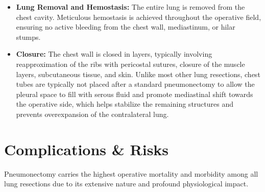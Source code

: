 \begin{itemize}
  \item \textbf{Lung Removal and Hemostasis:} The entire lung is removed from the chest cavity. Meticulous hemostasis is achieved throughout the operative field, ensuring no active bleeding from the chest wall, mediastinum, or hilar stumps.
  
  \item \textbf{Closure:} The chest wall is closed in layers, typically involving reapproximation of the ribs with pericostal sutures, closure of the muscle layers, subcutaneous tissue, and skin. Unlike most other lung resections, chest tubes are typically not placed after a standard pneumonectomy to allow the pleural space to fill with serous fluid and promote mediastinal shift towards the operative side, which helps stabilize the remaining structures and prevents overexpansion of the contralateral lung.
\end{itemize}

\section*{Complications \& Risks}
Pneumonectomy carries the highest operative mortality and morbidity among all lung resections due to its extensive nature and profound physiological impact.

